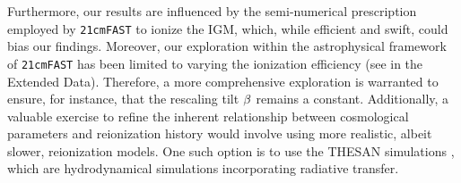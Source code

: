 Furthermore, our results are influenced by the semi-numerical
prescription employed by \texttt{21cmFAST} to ionize the IGM, which,
while efficient and swift, could bias our findings.
Moreover, our exploration within the astrophysical framework of
\texttt{21cmFAST} has been limited to varying the ionization efficiency
(see  in the Extended Data).
Therefore, a more comprehensive exploration is warranted to ensure, for
instance, that the rescaling tilt $\beta$ remains a constant.
Additionally, a valuable exercise to refine the inherent relationship
between cosmological parameters and reionization history would involve
using more realistic, albeit slower, reionization models.
One such option is to use the THESAN simulations \cite{Kannan2022},
which are hydrodynamical simulations incorporating radiative transfer.



